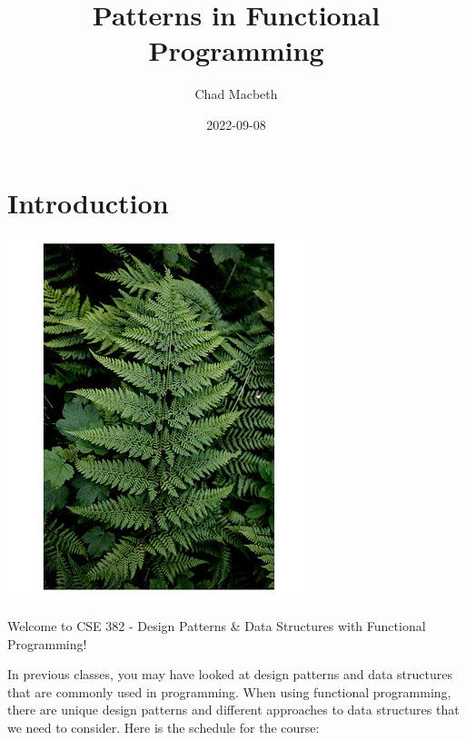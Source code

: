\documentclass[
]{book}
\title{Patterns in Functional Programming}
\author{Chad Macbeth}
\date{2022-09-08}
\begin{document}
\maketitle

{
\setcounter{tocdepth}{1}
\tableofcontents
}
\hypertarget{introduction}{%
\chapter*{Introduction}\label{introduction}}

\includegraphics{images/cover.jpg}

Welcome to CSE 382 - Design Patterns \& Data Structures with Functional Programming!

In previous classes, you may have looked at design patterns and data structures that are commonly used in programming. When using functional programming, there are unique design patterns and different approaches to data structures that we need to consider. Here is the schedule for the course:
\end{document}
